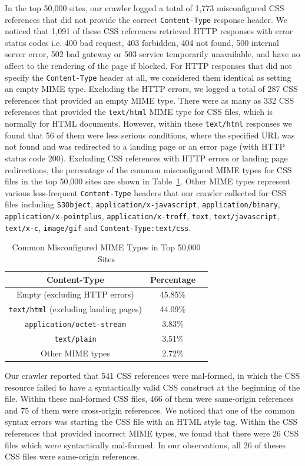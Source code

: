 \documentclass{acm_proc_article-sp}
\begin{document}
In the top 50,000 sites, our crawler logged a total of 1,773 misconfigured CSS references that did not provide the correct \texttt{Content-Type} response header. We noticed that 1,091 of these CSS references retrieved HTTP responses with error status codes i.e. 400 bad request, 403 forbidden, 404 not found, 500 internal server error, 502 bad gateway or 503 service temporarily unavailable, and have no affect to the rendering of the page if blocked. For HTTP responses that did not specify the \texttt{Content-Type} header at all, we considered them identical as setting an empty MIME type. Excluding the HTTP errors, we logged a total of 287 CSS references that provided an empty MIME type. There were as many as 332 CSS references that provided the \texttt{text/html} MIME type for CSS files, which is normally for HTML documents. However, within these \texttt{text/html} responses we found that 56 of them were less serious conditions, where the specified URL was not found and was redirected to a landing page or an error page (with HTTP status code 200). Excluding CSS references with HTTP errors or landing page redirections, the percentage of the common misconfigured MIME types for CSS files in the top 50,000  sites are shown in Table~\ref{table:MIME}. Other MIME types represent various less-frequent \texttt{Content-Type} headers that our crawler collected for CSS files including \texttt{S3Object}, \texttt{application/x-javascript}, \texttt{application/binary}, \texttt{application/x-pointplus}, \texttt{application/x-troff}, \texttt{text}, \texttt{text/javascript}, \texttt{text/x-c}, \texttt{image/gif} and \texttt{Content-Type:text/css}.

\begin{table}
\centering
\begin{tabular}{|c|c|c|} \hline
Content-Type&Percentage\\ \hline
Empty (excluding HTTP errors)&45.85\%\\ \hline
\texttt{text/html} (excluding landing pages)&44.09\%\\ \hline
\texttt{application/octet-stream}&3.83\%\\ \hline
\texttt{text/plain}&3.51\%\\ \hline
Other MIME types&2.72\%\\
\hline\end{tabular}
\caption{Common Misconfigured MIME Types in Top 50,000 Sites}
\label{table:MIME}
\end{table}

Our crawler reported that 541 CSS references were mal-formed, in which the CSS resource failed to have a syntactically valid CSS construct at the beginning of the file. Within these mal-formed CSS files, 466 of them were same-origin references and 75 of them were cross-origin references. We noticed that one of the common syntax errors was starting the CSS file with an HTML style tag. Within the CSS references that provided incorrect MIME types, we found that there were 26 CSS files which were syntactically mal-formed. In our observations, all 26 of theses CSS files were same-origin references.
\end{document}

